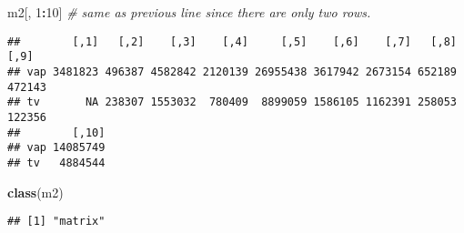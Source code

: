 \documentclass[]{article}
\newenvironment{Shaded}{\begin{snugshade}}{\end{snugshade}}
\newcommand{\KeywordTok}[1]{\textcolor[rgb]{0.13,0.29,0.53}{\textbf{#1}}}
\newcommand{\DecValTok}[1]{\textcolor[rgb]{0.00,0.00,0.81}{#1}}
\newcommand{\CommentTok}[1]{\textcolor[rgb]{0.56,0.35,0.01}{\textit{#1}}}
\newcommand{\OperatorTok}[1]{\textcolor[rgb]{0.81,0.36,0.00}{\textbf{#1}}}
\newcommand{\NormalTok}[1]{#1}
\begin{document}
\begin{Shaded}
\begin{Highlighting}[]
\NormalTok{m2[, }\DecValTok{1}\OperatorTok{:}\DecValTok{10}\NormalTok{] }\CommentTok{# same as previous line since there are only two rows.}
\end{Highlighting}
\end{Shaded}

\begin{verbatim}
##        [,1]   [,2]    [,3]    [,4]     [,5]    [,6]    [,7]   [,8]   [,9]
## vap 3481823 496387 4582842 2120139 26955438 3617942 2673154 652189 472143
## tv       NA 238307 1553032  780409  8899059 1586105 1162391 258053 122356
##        [,10]
## vap 14085749
## tv   4884544
\end{verbatim}

\begin{Shaded}
\begin{Highlighting}[]
\KeywordTok{class}\NormalTok{(m2)}
\end{Highlighting}
\end{Shaded}

\begin{verbatim}
## [1] "matrix"
\end{verbatim}
\end{document}
